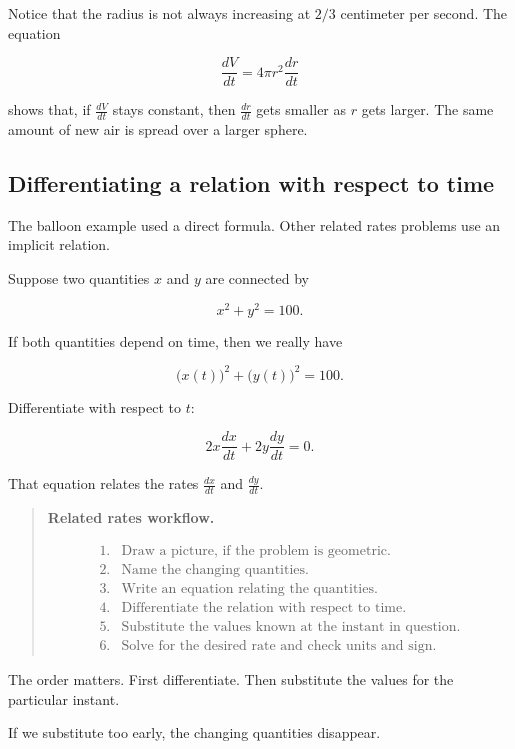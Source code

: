 Notice that the radius is not always increasing at \(2/3\) centimeter per second.  The
equation

\[
\frac{dV}{dt}=4\pi r^2\frac{dr}{dt}
\]

shows that, if \(\frac{dV}{dt}\) stays constant, then \(\frac{dr}{dt}\) gets smaller as \(r\)
gets larger.  The same amount of new air is spread over a larger sphere.

\subsection{Differentiating a relation with respect to time}
\label{subsec:differentiating-relation-time}

The balloon example used a direct formula.  Other related rates problems use an implicit
relation.

Suppose two quantities \(x\) and \(y\) are connected by

\[
x^2+y^2=100.
\]

If both quantities depend on time, then we really have

\[
\bigl(x(t)\bigr)^2+\bigl(y(t)\bigr)^2=100.
\]

Differentiate with respect to \(t\):

\[
2x\frac{dx}{dt}+2y\frac{dy}{dt}=0.
\]

That equation relates the rates \(\frac{dx}{dt}\) and \(\frac{dy}{dt}\).

\begin{quote}
\textbf{Related rates workflow.}

\[
\begin{array}{ll}
\text{1.} & \text{Draw a picture, if the problem is geometric.}\\
\text{2.} & \text{Name the changing quantities.}\\
\text{3.} & \text{Write an equation relating the quantities.}\\
\text{4.} & \text{Differentiate the relation with respect to time.}\\
\text{5.} & \text{Substitute the values known at the instant in question.}\\
\text{6.} & \text{Solve for the desired rate and check units and sign.}
\end{array}
\]
\end{quote}

The order matters.  First differentiate.  Then substitute the values for the particular
instant.

If we substitute too early, the changing quantities disappear.

